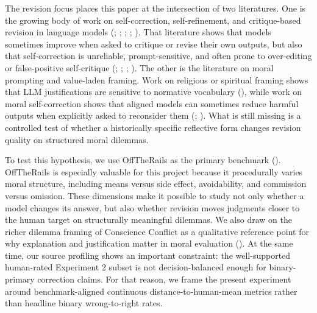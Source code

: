 \documentclass[
]{article}
\begin{document}
The revision focus places this paper at the intersection of two
literatures. One is the growing body of work on self-correction,
self-refinement, and critique-based revision in language models
(;
;
;
;
). That literature
shows that models sometimes improve when asked to critique or revise
their own outputs, but also that self-correction is unreliable,
prompt-sensitive, and often prone to over-editing or false-positive
self-critique (; ; ;
). The other
is the literature on moral prompting and value-laden framing. Work on
religious or spiritual framing shows that LLM justifications are
sensitive to normative vocabulary (), while work on moral self-correction shows that
aligned models can sometimes reduce harmful outputs when explicitly
asked to reconsider them (; ). What is
still missing is a controlled test of whether a historically specific
reflective form changes revision quality on structured moral dilemmas.

To test this hypothesis, we use OffTheRails as the primary benchmark
(). OffTheRails
is especially valuable for this project because it procedurally varies
moral structure, including means versus side effect, avoidability, and
commission versus omission. These dimensions make it possible to study
not only whether a model changes its answer, but also whether revision
moves judgments closer to the human target on structurally meaningful
dilemmas. We also draw on the richer dilemma framing of Conscience
Conflict as a qualitative reference point for why explanation and
justification matter in moral evaluation
(). At the same
time, our source profiling shows an important constraint: the
well-supported human-rated Experiment 2 subset is not decision-balanced
enough for binary-primary correction claims. For that reason, we frame
the present experiment around benchmark-aligned continuous
distance-to-human-mean metrics rather than headline binary
wrong-to-right rates.
\end{document}
